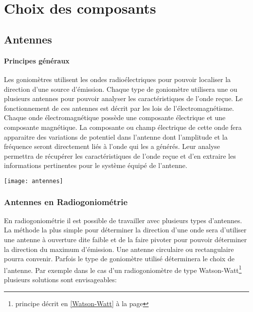 \chapter{Choix des composants}


\section{Antennes}

\subsubsection{Principes généraux}

	Les goniomètres utilisent les ondes radioélectriques pour pouvoir localiser la direction d'une source d'émission. Chaque type de goniomètre utilisera une ou plusieurs antennes pour pouvoir analyser les caractéristiques de l'onde reçue. 
	Le fonctionnement de ces antennes est décrit par les lois de l'électromagnétisme. Chaque onde électromagnétique possède une composante électrique et une composante magnétique. La composante ou champ électrique de cette onde fera apparaitre des variations de potentiel dans l'antenne dont l'amplitude et la fréquence seront directement liés à l'onde qui les a générés. Leur analyse permettra de récupérer les caractéristiques de l'onde reçue et d'en extraire les informations pertinentes pour le système équipé de l'antenne.

        \begin{center}
          \texttt{[image: antennes]}
        \end{center}

\subsection{Antennes en Radiogoniométrie}

En radiogoniométrie il est possible de travailler avec plusieurs types d'antennes. La méthode la plus simple pour déterminer la direction d'une onde sera d'utiliser une antenne à ouverture dite faible et de la faire pivoter pour pouvoir déterminer la direction du maximum d'émission. Une antenne circulaire ou rectangulaire pourra convenir. Parfois le type de goniomètre utilisé déterminera le choix de l'antenne. Par exemple dans le cas d'un radiogoniomètre de type Watson-Watt\footnote{principe décrit en \ref{Watson-Watt} à la page \pageref{Watson-Watt}} plusieurs solutions sont envisageables: 
	
